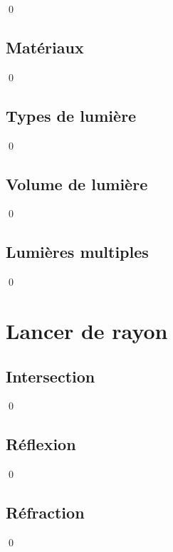 \documentclass[12pt]{article}
\newcommand{\state}{\noindent}
\begin{document}
\state

\qed

\subsection{Matériaux}

\state

\qed

\subsection{Types de lumière}

\state

\qed

\subsection{Volume de lumière}

\state

\qed

\subsection{Lumières multiples}

\state

\qed

\pagebreak

\section{Lancer de rayon}

\subsection{Intersection}

\state

\qed

\subsection{Réflexion}

\state

\qed

\subsection{Réfraction}

\state

\qed
\end{document}
